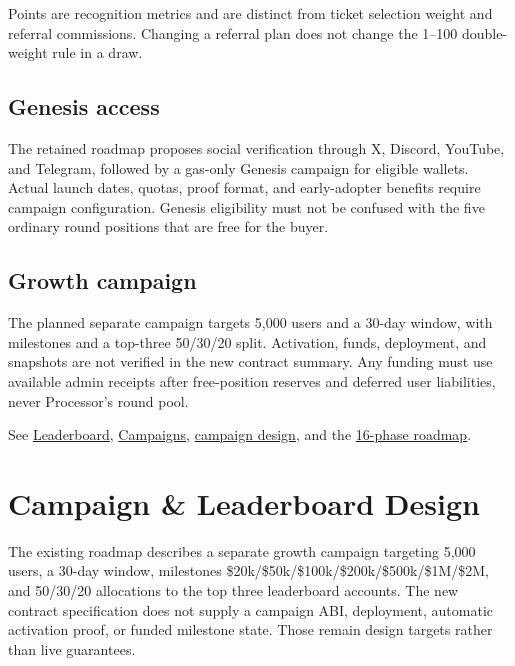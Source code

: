 \documentclass[
  10pt,
  letterpaper,
]{article}
\begin{document}
Points are recognition metrics and are distinct from ticket selection
weight and referral commissions. Changing a referral plan does not
change the 1--100 double-weight rule in a draw.

\subsection{Genesis access}\label{genesis-access}

The retained roadmap proposes social verification through X, Discord,
YouTube, and Telegram, followed by a gas-only Genesis campaign for
eligible wallets. Actual launch dates, quotas, proof format, and
early-adopter benefits require campaign configuration. Genesis
eligibility must not be confused with the five ordinary round positions
that are free for the buyer.

\subsection{Growth campaign}\label{growth-campaign}

The planned separate campaign targets 5,000 users and a 30-day window,
with milestones and a top-three 50/30/20 split. Activation, funds,
deployment, and snapshots are not verified in the new contract summary.
Any funding must use available admin receipts after free-position
reserves and deferred user liabilities, never Processor's round pool.

See
\href{https://github.com/alirezaehteshampour/Fos-Doc/blob/main/content/docs/leaderboard.mdx}{Leaderboard},
\href{https://github.com/alirezaehteshampour/Fos-Doc/blob/main/content/docs/campaigns/index.mdx}{Campaigns},
\href{https://github.com/alirezaehteshampour/Fos-Doc/blob/main/content/docs/technical/campaign-contract.mdx}{campaign
design}, and the
\href{https://github.com/alirezaehteshampour/Fos-Doc/blob/main/content/docs/roadmap.mdx}{16-phase
roadmap}.

\section{Campaign \& Leaderboard
Design}\label{campaign-leaderboard-design}

The existing roadmap describes a separate growth campaign targeting
5,000 users, a 30-day window, milestones
\$20k/\$50k/\$100k/\$200k/\$500k/\$1M/\$2M, and 50/30/20 allocations to
the top three leaderboard accounts. The new contract specification does
not supply a campaign ABI, deployment, automatic activation proof, or
funded milestone state. Those remain design targets rather than live
guarantees.
\end{document}
